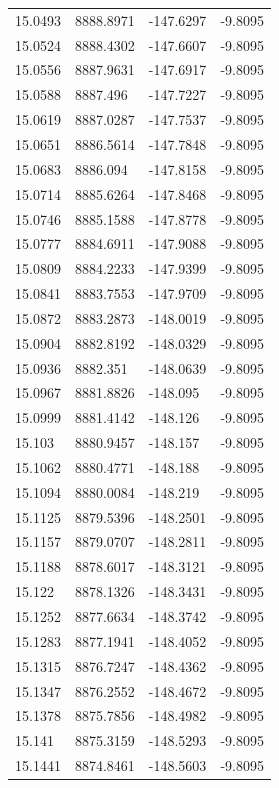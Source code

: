 \begin{table}[H]
\begin{tabular}{llll}
15.0493 & 8888.8971 & -147.6297 & -9.8095 \\
15.0524 & 8888.4302 & -147.6607 & -9.8095 \\
15.0556 & 8887.9631 & -147.6917 & -9.8095 \\
15.0588 & 8887.496 & -147.7227 & -9.8095 \\
15.0619 & 8887.0287 & -147.7537 & -9.8095 \\
15.0651 & 8886.5614 & -147.7848 & -9.8095 \\
15.0683 & 8886.094 & -147.8158 & -9.8095 \\
15.0714 & 8885.6264 & -147.8468 & -9.8095 \\
15.0746 & 8885.1588 & -147.8778 & -9.8095 \\
15.0777 & 8884.6911 & -147.9088 & -9.8095 \\
15.0809 & 8884.2233 & -147.9399 & -9.8095 \\
15.0841 & 8883.7553 & -147.9709 & -9.8095 \\
15.0872 & 8883.2873 & -148.0019 & -9.8095 \\
15.0904 & 8882.8192 & -148.0329 & -9.8095 \\
15.0936 & 8882.351 & -148.0639 & -9.8095 \\
15.0967 & 8881.8826 & -148.095 & -9.8095 \\
15.0999 & 8881.4142 & -148.126 & -9.8095 \\
15.103 & 8880.9457 & -148.157 & -9.8095 \\
15.1062 & 8880.4771 & -148.188 & -9.8095 \\
15.1094 & 8880.0084 & -148.219 & -9.8095 \\
15.1125 & 8879.5396 & -148.2501 & -9.8095 \\
15.1157 & 8879.0707 & -148.2811 & -9.8095 \\
15.1188 & 8878.6017 & -148.3121 & -9.8095 \\
15.122 & 8878.1326 & -148.3431 & -9.8095 \\
15.1252 & 8877.6634 & -148.3742 & -9.8095 \\
15.1283 & 8877.1941 & -148.4052 & -9.8095 \\
15.1315 & 8876.7247 & -148.4362 & -9.8095 \\
15.1347 & 8876.2552 & -148.4672 & -9.8095 \\
15.1378 & 8875.7856 & -148.4982 & -9.8095 \\
15.141 & 8875.3159 & -148.5293 & -9.8095 \\
15.1441 & 8874.8461 & -148.5603 & -9.8095 \\

\end{tabular}
\end{table}
